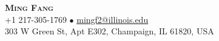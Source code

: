 \documentclass[letterpaper,11pt]{article} %
\begin{document}

\begin{comment}
In Europe it is common to include a picture of ones self in the CV. Select
which heading appropriate for the document you are creating.
\end{comment}


\begin{center}
    \textbf{\Huge \scshape Ming Fang} \\ \vspace{1pt} %
    \small +1 217-305-1769 $\bullet$ 
    \href{mailto:mingf2@illinois.edu}{{mingf2@illinois.edu}}\\ \vspace{1pt}
    {303 W Green St, Apt E302, Champaign, IL 61820, USA}
\end{center}
\end{document}
